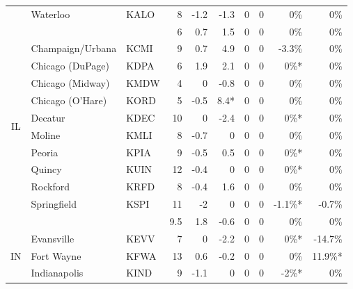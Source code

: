 \documentclass[twocol]{ametsoc}
\begin{document}
\begin{landscape}
\begin{table}[]
\begin{tabular}{@{}cllrrrrrrr@{}}
                     & Waterloo                   & KALO & 8    & -1.2  & -1.3  & 0     & 0    & 0\%     & 0\%      \\ \cmidrule(l){2-10} 
                     &                            &      & 6    & 0.7   & 1.5   & 0     & 0    & 0\%     & 0\%      \\ \midrule
\multirow{10}{*}{IL} & Champaign/Urbana           & KCMI & 9    & 0.7   & 4.9   & 0     & 0    & -3.3\%  & 0\%      \\
                     & Chicago (DuPage)           & KDPA & 6    & 1.9   & 2.1   & 0     & 0    & 0\%*    & 0\%      \\
                     & Chicago (Midway)           & KMDW & 4    & 0     & -0.8  & 0     & 0    & 0\%     & 0\%      \\
                     & Chicago (O'Hare)           & KORD & 5    & -0.5  & 8.4*  & 0     & 0    & 0\%     & 0\%      \\
                     & Decatur                    & KDEC & 10   & 0     & -2.4  & 0     & 0    & 0\%*    & 0\%      \\
                     & Moline                     & KMLI & 8    & -0.7  & 0     & 0     & 0    & 0\%     & 0\%      \\
                     & Peoria                     & KPIA & 9    & -0.5  & 0.5   & 0     & 0    & 0\%*    & 0\%      \\
                     & Quincy                     & KUIN & 12   & -0.4  & 0     & 0     & 0    & 0\%*    & 0\%      \\
                     & Rockford                   & KRFD & 8    & -0.4  & 1.6   & 0     & 0    & 0\%     & 0\%      \\
                     & Springfield                & KSPI & 11   & -2    & 0     & 0     & 0    & -1.1\%* & -0.7\%   \\ \cmidrule(l){2-10} 
                     &                            &      & 9.5  & 1.8   & -0.6  & 0     & 0    & 0\%     & 0\%      \\ \midrule
\multirow{5}{*}{IN}  & Evansville                 & KEVV & 7    & 0     & -2.2  & 0     & 0    & 0\%*    & -14.7\%  \\
                     & Fort Wayne                 & KFWA & 13   & 0.6   & -0.2  & 0     & 0    & 0\%     & 11.9\%*  \\
                     & Indianapolis               & KIND & 9    & -1.1  & 0     & 0     & 0    & -2\%*   & 0\%      \\

\end{tabular}
\end{table}
\end{landscape}
\end{document}
